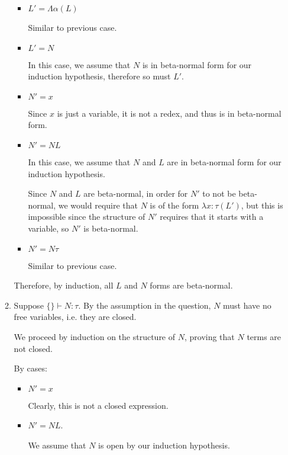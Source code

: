 \begin{enumerate}[label=(\alph*)]
\begin{enumerate}[label=(\roman*)]
\begin{itemize}
        \item
          $L' = \Lambda \alpha(L)$

          Similar to previous case.

        \item
          $L' = N$

          In this case, we assume that $N$ is in beta-normal form for our induction hypothesis, therefore so must $L'$.

        \item
          $N' = x$

          Since $x$ is just a variable, it is not a redex, and thus is in beta-normal form.

        \item
          $N' = N L$

          In this case, we assume that $N$ and $L$ are in beta-normal form for our induction hypothesis.

          Since $N$ and $L$ are beta-normal, in order for $N'$ to not be beta-normal, we would require that $N$ is of the form $\lambda x : \tau(L')$, but this is impossible since the structure of $N'$ requires that it starts with a variable, so $N'$ is beta-normal.

        \item
          $N' = N \tau$

          Similar to previous case.
      \end{itemize}

      Therefore, by induction, all $L$ and $N$ forms are beta-normal.

    \item

      Suppose $\{\} \vdash N : \tau$. By the assumption in the question, $N$ must have no free variables, i.e. they are closed.

      We proceed by induction on the structure of $N$, proving that $N$ terms are not closed.

      By cases:

      \begin{itemize}
        \item
          $N' = x$

          Clearly, this is not a closed expression.

        \item
          $N' = N L$.

          We assume that $N$ is open by our induction hypothesis.


\end{itemize}
\end{enumerate}
\end{enumerate}
